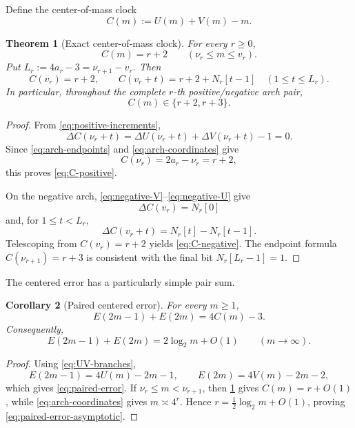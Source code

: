 \documentclass[11pt]{article}
\newtheorem{theorem}{Theorem}[section]
\newtheorem{corollary}[theorem]{Corollary}
\theoremstyle{definition}
\theoremstyle{remark}
\begin{document}
Define the center-of-mass clock
\begin{equation}
C(m):=U(m)+V(m)-m.
\label{eq:C-clock}
\end{equation}

\begin{theorem}[Exact center-of-mass clock]
\label{thm:center-clock}
For every \(r\ge0\),
\begin{equation}
C(m)=r+2
\qquad(\nu_r\le m\le v_r).
\label{eq:C-positive}
\end{equation}
Put \(L_r:=4a_r-3=\nu_{r+1}-v_r\).  Then
\begin{equation}
C(v_r)=r+2,
\qquad
C(v_r+t)=r+2+N_r[t-1]
\quad(1\le t\le L_r).
\label{eq:C-negative}
\end{equation}
In particular, throughout the complete \(r\)-th positive/negative arch pair,
\begin{equation}
C(m)\in\{r+2,r+3\}.
\label{eq:C-two-values}
\end{equation}
\end{theorem}

\begin{proof}
From \eqref{eq:positive-increments},
\[
\Delta C(\nu_r+t)
=\Delta U(\nu_r+t)+\Delta V(\nu_r+t)-1=0.
\]
Since \eqref{eq:arch-endpoints} and \eqref{eq:arch-coordinates} give
\[
C(\nu_r)=2a_r-\nu_r=r+2,
\]
this proves \eqref{eq:C-positive}.

On the negative arch, \eqref{eq:negative-V}--\eqref{eq:negative-U} give
\[
\Delta C(v_r)=N_r[0]
\]
and, for \(1\le t<L_r\),
\[
\Delta C(v_r+t)=N_r[t]-N_r[t-1].
\]
Telescoping from \(C(v_r)=r+2\) yields \eqref{eq:C-negative}.  The endpoint formula
\(C(\nu_{r+1})=r+3\) is consistent with the final bit \(N_r[L_r-1]=1\).
\end{proof}

The centered error has a particularly simple pair sum.

\begin{corollary}[Paired centered error]
\label{cor:paired-error}
For every \(m\ge1\),
\begin{equation}
{
E(2m-1)+E(2m)=4C(m)-3.
}
\label{eq:paired-error}
\end{equation}
Consequently,
\begin{equation}
E(2m-1)+E(2m)=2\log_2m+O(1)
\qquad(m\to\infty).
\label{eq:paired-error-asymptotic}
\end{equation}
\end{corollary}

\begin{proof}
Using \eqref{eq:UV-branches},
\[
E(2m-1)=4U(m)-2m-1,
\qquad
E(2m)=4V(m)-2m-2,
\]
which gives \eqref{eq:paired-error}.  If \(\nu_r\le m<\nu_{r+1}\), then \cref{thm:center-clock} gives \(C(m)=r+O(1)\), while \eqref{eq:arch-coordinates} gives \(m\asymp4^r\).  Hence
\(r=\tfrac12\log_2m+O(1)\), proving \eqref{eq:paired-error-asymptotic}.
\end{proof}
\end{document}

